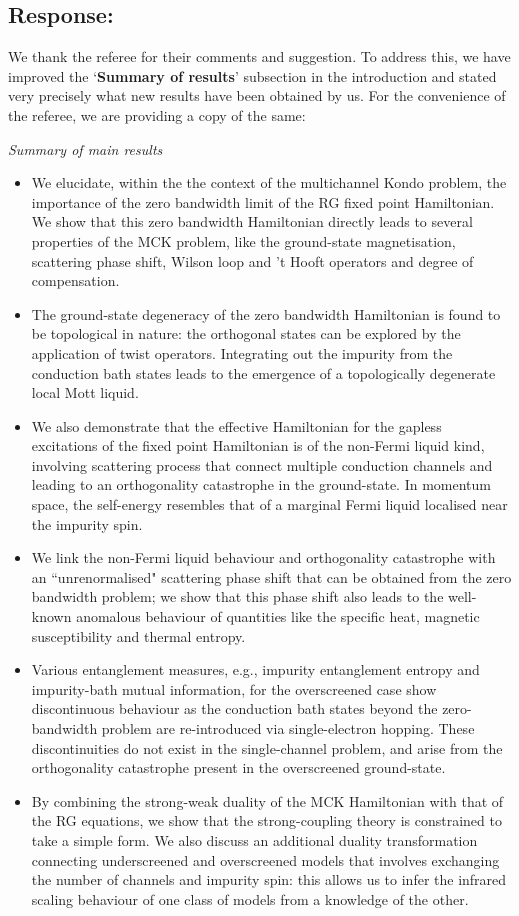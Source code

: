 \documentclass{article}
\newcommand{\response}[1]{{\color{blue}\subsection*{Response:}{#1}}}
\begin{document}
\response{We thank the referee for their comments and suggestion. To address this, we have improved the `{\bf Summary of results}' subsection in the introduction and stated very precisely what new results have been obtained by us.
For the convenience of the referee, we are providing a copy of the same:

{\it \flushleft Summary of main results}
	\begin{itemize}
	\item We elucidate, within the the context of the multichannel Kondo problem, the importance of the zero bandwidth limit of the RG fixed point Hamiltonian. We show that this zero bandwidth Hamiltonian directly leads to several properties of the MCK problem, like the ground-state magnetisation, scattering phase shift, Wilson loop and 't Hooft operators and degree of compensation.
	\item The ground-state degeneracy of the zero bandwidth Hamiltonian is found to be topological in nature: the orthogonal states can be explored by the application of twist operators. Integrating out the impurity from the conduction bath states leads to the emergence of a topologically degenerate local Mott liquid.
	\item We also demonstrate that the effective Hamiltonian for the gapless excitations of the fixed point Hamiltonian is of the non-Fermi liquid kind, involving scattering process that connect multiple conduction channels and leading to an orthogonality catastrophe in the ground-state. In momentum space, the self-energy resembles that of a marginal Fermi liquid localised near the impurity spin. 
	\item We link the non-Fermi liquid behaviour and orthogonality catastrophe with an ``unrenormalised" scattering phase shift that can be obtained from the zero bandwidth problem; we show that this phase shift also leads to the well-known anomalous behaviour of quantities like the specific heat, magnetic susceptibility and thermal entropy.
	\item Various entanglement measures, e.g., impurity entanglement entropy and impurity-bath mutual information, for the overscreened case show discontinuous behaviour as the conduction bath states beyond the zero-bandwidth problem are re-introduced via single-electron hopping. These discontinuities do not exist in the single-channel problem, and arise from the orthogonality catastrophe present in the overscreened ground-state.
	\item By combining the strong-weak duality of the MCK Hamiltonian with that of the RG equations, we show that the strong-coupling theory is constrained to take a simple form. We also discuss an additional duality transformation connecting underscreened and overscreened models that involves exchanging the number of channels and impurity spin: this allows us to infer the infrared scaling behaviour of one  class of models from a knowledge of the other.
	\end{itemize}
}
\end{document}
